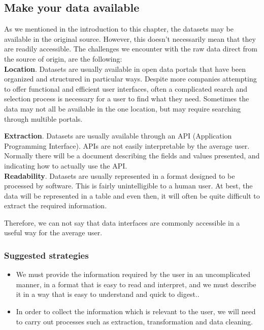 \subsection{Make your data available}
    
As we mentioned in the introduction to this chapter, the datasets may be available in the original source. However, this doesn't necessarily
mean that they are readily accessible.
The challenges we encounter with the raw data direct from the source of origin, are the following: \\   
 
\textbf{Location}. Datasets are usually available in open data portals that have been organized and structured in particular ways.
Despite more companies attempting to offer functional and efficient user interfaces, often a complicated search and selection process is necessary for a user to find what they need. Sometimes the data may not all be available in the one location, but may require searching through multible portals.

\textbf{Extraction}. Datasets are usually available through an API (Application Programming Interface). APIs are not easily interpretable by the average user. Normally there will be a document describing the fields and values presented, and indicating how to actually use the API. \\

\textbf{Readability}. Datasets are usually represented in a format designed to be processed by software. This is fairly unintelligible to a human user. At best,
the data will be represented in a table and even then, it will often be quite difficult to extract the required information.

Therefore, we can not say that data interfaces are commonly accessible in a useful way for the average user. \\

\subsubsection*{Suggested strategies} 

\begin{itemize}
    \item We must provide the information required by the user in an uncomplicated manner, in a format that is easy to read and interpret,
          and we must describe it in a way that is easy to understand and quick to digest..\\
    \item In order to collect the information which is relevant to the user, we will need to carry out processes such as extraction, transformation and
          data cleaning.
\end{itemize}
 

